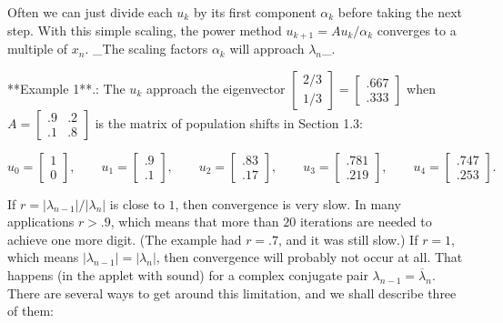
Often we can just divide each \(u_{k}\) by its first component \(\alpha_{k}\) before taking the next step. With this simple scaling, the power method \(u_{k+1}=Au_{k}/\alpha_{k}\) converges to a multiple of \(x_{n}\). _The scaling factors \(\alpha_{k}\) will approach \(\lambda_{n}\)_.

**Example 1**.: The \(u_{k}\) approach the eigenvector \(\left[\begin{smallmatrix}2/3\\ 1/3\end{smallmatrix}\right]=\left[\begin{smallmatrix}.667\\ .333\end{smallmatrix}\right]\) when \(A=\left[\begin{smallmatrix}.9&.2\\ .1&.8\end{smallmatrix}\right]\) is the matrix of population shifts in Section 1.3:

\[u_{0}=\begin{bmatrix}1\\ 0\end{bmatrix},\qquad u_{1}=\begin{bmatrix}.9\\ .1\end{bmatrix},\qquad u_{2}=\begin{bmatrix}.83\\ .17\end{bmatrix},\qquad u_{3}=\begin{bmatrix}.781\\ .219\end{bmatrix},\qquad u_{4}=\begin{bmatrix}.747\\ .253\end{bmatrix}.\]

If \(r=|\lambda_{n-1}|/|\lambda_{n}|\) is close to \(1\), then convergence is very slow. In many applications \(r>.9\), which means that more than \(20\) iterations are needed to achieve one more digit. (The example had \(r=.7\), and it was still slow.) If \(r=1\), which means \(|\lambda_{n-1}|=|\lambda_{n}|\), then convergence will probably not occur at all. That happens (in the applet with sound) for a complex conjugate pair \(\lambda_{n-1}=\overline{\lambda}_{n}\). There are several ways to get around this limitation, and we shall describe three of them:

